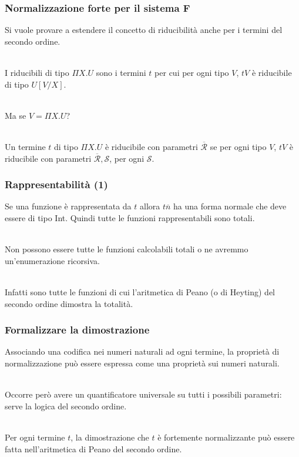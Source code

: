 \documentclass[aspectratio=43]{beamer}
\renewcommand{\P}{\Pi}
\newcommand{\sub}[2]{\left[ #1 /  #2\right]}
\begin{document}
\begin{frame}
    \frametitle{Normalizzazione forte per il sistema F}
    Si vuole provare a estendere il concetto di riducibilit\`a anche per i
    termini del secondo ordine.
    \\~\

    I riducibili di tipo $\P X. U$ sono i termini $t$ per cui per ogni tipo $V$,
    $tV$ \`e riducibile di tipo $U\sub{V}{X}$.
    \\~\

    Ma se $V = \P X.U$?
    \\~\

    Un termine $t$ di tipo $\P X. U$ \`e riducibile con parametri
    $\overline{\mathcal{R}}$ se per ogni tipo $V$, $tV$ \`e riducibile con
    parametri $\overline{\mathcal{R}}, \mathcal{S}$, per ogni $\mathcal{S}$.

\end{frame}

\begin{frame}
    \frametitle{Rappresentabilit\`a (1)}
    Se una funzione \`e rappresentata da $t$ allora $t\overline{n}$ ha una forma
    normale che deve essere di tipo Int. Quindi tutte le funzioni
    rappresentabili sono totali.
    \\~\

    Non possono essere tutte le funzioni calcolabili totali o ne avremmo
    un'enumerazione ricorsiva.
    \\~\

    Infatti sono tutte le funzioni di cui l'aritmetica di Peano (o di Heyting)
    del secondo ordine dimostra la totalit\`a.
\end{frame}

\begin{frame}
    \frametitle{Formalizzare la dimostrazione}
    Associando una codifica nei numeri naturali ad ogni termine, la propriet\`a
    di normalizzazione pu\`o essere espressa come una propriet\`a sui numeri
    naturali.
    \\~\

    Occorre per\`o avere un quantificatore universale su tutti i possibili
    parametri: serve la logica del secondo ordine.
    \\~\

    Per ogni termine $t$, la dimostrazione che $t$ \`e fortemente normalizzante
    pu\`o essere fatta nell'aritmetica di Peano del secondo ordine.
\end{frame}
\end{document}
